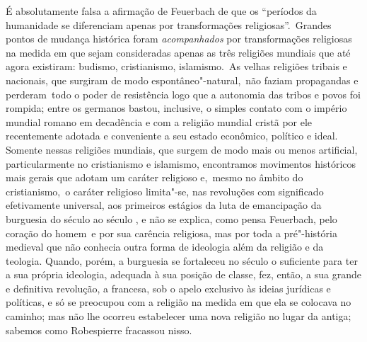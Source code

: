 É absolutamente falsa a afirmação
de Feuerbach
de que os ``períodos da humanidade se diferenciam apenas por
transformações religiosas''. \textbar{}\,Grandes pontos de mudança histórica
foram \emph{acompanhados} por transformações religiosas na medida em
que sejam consideradas apenas as três religiões mundiais que até agora %
existiram: budismo, cristianismo, islamismo.\,\textbar{} As velhas religiões
tribais e nacionais, que surgiram de modo espontâneo"-natural, \textbar{}\,não
faziam propagandas e perderam\,\textbar{} todo o poder de resistência logo que a %
autonomia das tribos e povos foi rompida; entre os germanos bastou,
inclusive, o simples contato com o império mundial romano em decadência e
com a religião mundial cristã por ele recentemente adotada e conveniente
a seu estado econômico, político e ideal. Somente nessas religiões
mundiais, que surgem de modo mais ou menos artificial, particularmente
no cristianismo e islamismo, encontramos movimentos históricos mais
gerais que adotam um caráter religioso e, \textbar{}\,mesmo no âmbito do
cristianismo,\,\textbar{} o caráter religioso limita"-se, nas revoluções com
significado efetivamente universal, aos primeiros estágios da luta de
emancipação da burguesia do século  ao século , e não se
explica, como pensa
Feuerbach,
pelo coração do homem\est\ e por sua carência religiosa, mas por toda a
pré"-história medieval que não conhecia outra forma de ideologia além da
religião e da teologia. Quando, porém, a burguesia se
fortaleceu no século  o suficiente para ter a sua própria ideologia, adequada à
sua posição de classe, fez, então, a sua grande e definitiva revolução,
a francesa, sob o apelo exclusivo às ideias jurídicas e políticas, e só se
preocupou com a religião na medida em que ela se colocava no caminho;
mas não lhe ocorreu estabelecer uma nova religião no lugar da antiga; \textbar{}\,sabemos como Robespierre fracassou nisso.\,\textbar{}

